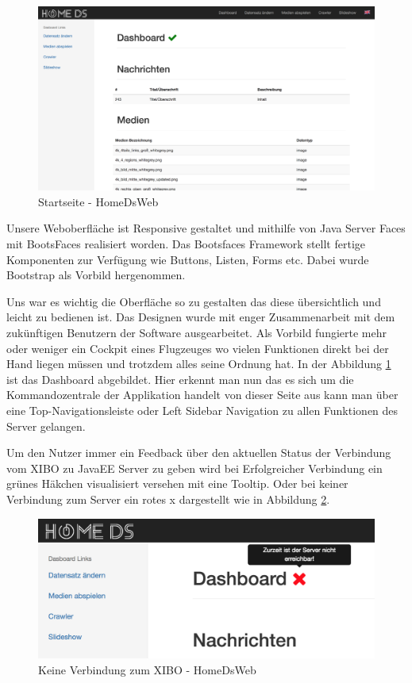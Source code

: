 \begin{figure}[h]
\centering
\includegraphics[width=1\textwidth]{images/08_HomeDsWeb/DashboardHomeDsWeb.png}
\caption{Startseite - HomeDsWeb}
\label{img:Startseite}
\end{figure}

Unsere Weboberfläche ist Responsive gestaltet und mithilfe von Java Server Faces mit BootsFaces realisiert worden. Das Bootsfaces Framework stellt fertige Komponenten zur Verfügung wie Buttons, Listen, Forms etc. Dabei wurde Bootstrap als Vorbild hergenommen.

Uns war es wichtig die Oberfläche so zu gestalten das diese übersichtlich und leicht zu bedienen ist. Das Designen wurde mit enger Zusammenarbeit mit dem zukünftigen Benutzern der Software ausgearbeitet. Als Vorbild fungierte mehr oder weniger ein Cockpit eines Flugzeuges wo vielen Funktionen direkt bei der Hand liegen müssen und trotzdem alles seine Ordnung hat. In der Abbildung \ref{img:Startseite} ist das Dashboard abgebildet. 
Hier erkennt man nun das es sich um die Kommandozentrale der Applikation handelt von dieser Seite aus kann man über eine Top-Navigationsleiste oder Left Sidebar Navigation zu allen Funktionen des Server gelangen. 

Um den Nutzer immer ein Feedback über den aktuellen Status der Verbindung vom XIBO zu JavaEE Server zu geben wird bei Erfolgreicher Verbindung ein grünes Häkchen visualisiert versehen mit eine Tooltip. Oder bei keiner Verbindung zum Server ein rotes x dargestellt wie in Abbildung  \ref{img:NoConnection}.

\begin{figure}[h]
\includegraphics[width=1\textwidth]{images/08_HomeDsWeb/DashboardNoConnection.png}
\caption{Keine Verbindung zum XIBO - HomeDsWeb}
\label{img:NoConnection}
\end{figure}


